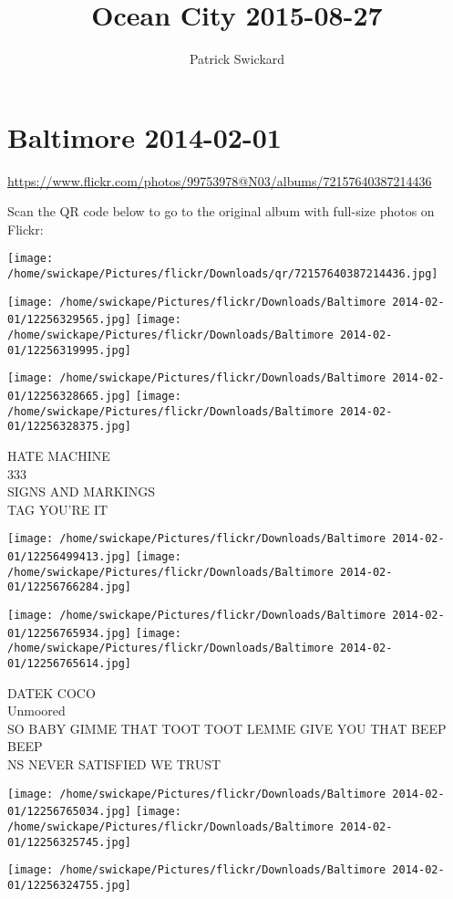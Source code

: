 \documentclass[10pt,letterpaper]{article}
\title{Ocean City 2015-08-27}
\author{Patrick Swickard}
\date{}
\begin{document}
\section*{Baltimore 2014-02-01}

\url{https://www.flickr.com/photos/99753978@N03/albums/72157640387214436}

Scan the QR code below to go to the original album with full-size photos on Flickr:

\texttt{[image: /home/swickape/Pictures/flickr/Downloads/qr/72157640387214436.jpg]}
\pagebreak

\texttt{[image: /home/swickape/Pictures/flickr/Downloads/Baltimore 2014-02-01/12256329565.jpg]}
\texttt{[image: /home/swickape/Pictures/flickr/Downloads/Baltimore 2014-02-01/12256319995.jpg]}

\texttt{[image: /home/swickape/Pictures/flickr/Downloads/Baltimore 2014-02-01/12256328665.jpg]}
\texttt{[image: /home/swickape/Pictures/flickr/Downloads/Baltimore 2014-02-01/12256328375.jpg]}

HATE MACHINE\\
333\\
SIGNS AND MARKINGS\\
TAG YOU'RE IT
\pagebreak

\texttt{[image: /home/swickape/Pictures/flickr/Downloads/Baltimore 2014-02-01/12256499413.jpg]}
\texttt{[image: /home/swickape/Pictures/flickr/Downloads/Baltimore 2014-02-01/12256766284.jpg]}

\texttt{[image: /home/swickape/Pictures/flickr/Downloads/Baltimore 2014-02-01/12256765934.jpg]}
\texttt{[image: /home/swickape/Pictures/flickr/Downloads/Baltimore 2014-02-01/12256765614.jpg]}

DATEK COCO\\
Unmoored\\
SO BABY GIMME THAT TOOT TOOT LEMME GIVE YOU THAT BEEP BEEP\\
NS NEVER SATISFIED WE TRUST
\pagebreak

\texttt{[image: /home/swickape/Pictures/flickr/Downloads/Baltimore 2014-02-01/12256765034.jpg]}
\texttt{[image: /home/swickape/Pictures/flickr/Downloads/Baltimore 2014-02-01/12256325745.jpg]}

\vspace{0.25in}
\texttt{[image: /home/swickape/Pictures/flickr/Downloads/Baltimore 2014-02-01/12256324755.jpg]}
\end{document}
